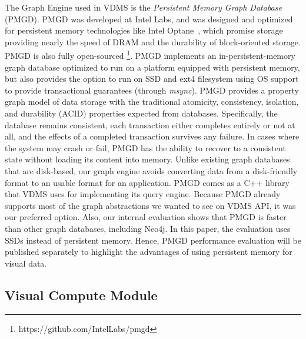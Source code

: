 The Graph Engine used in VDMS is the
\textit{Persistent Memory Graph Database} (PMGD).
PMGD was developed at Intel Labs, and was designed and optimized for
persistent memory technologies like Intel Optane~\cite{IntelXPoint15}, which
promise storage providing nearly the speed of DRAM and the
durability of block-oriented storage.
PMGD is also fully open-sourced \footnote{https://github.com/IntelLabs/pmgd}.
PMGD implements an in-persistent-memory graph database optimized
to run on a platform equipped with persistent memory, but
also provides the option to run on SSD and ext4 filesystem
using OS support to provide transactional guarantees (through \textit{msync}).
PMGD provides a property graph model of data storage with the traditional
atomicity, consistency, isolation, and durability
(ACID) properties expected from databases.
Specifically, the database remains consistent, each transaction either
completes entirely or not at all, and the effects of a completed transaction
survives any failure.
In cases where the system may crash or fail, PMGD has the ability
to recover to a consistent state without loading its content into memory.
Unlike existing graph databases that are disk-based, our graph engine
avoids converting data from a disk-friendly format to an usable format for an application.
PMGD comes as a C++ library that VDMS uses for implementing its query engine.
Because PMGD already supports most of the graph abstractions we wanted
to see on VDMS API, it was our preferred option.
Also, our internal evaluation shows that PMGD is faster
than other graph databases, including Neo4j\cite{miller2013graph}.
In this paper, the evaluation uses SSDs instead of persistent memory.
Hence, PMGD performance evaluation will be published separately to highlight
the advantages of using persistent memory for visual data.

\subsection{Visual Compute Module}



